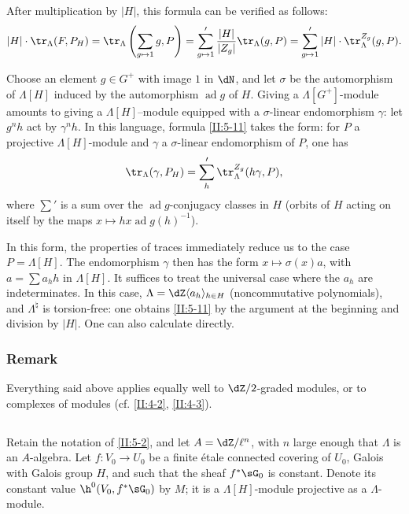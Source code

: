 \documentclass[oneside]{book}
\begin{document}
After multiplication by $|H|$, this formula can be verified as follows:
\[
  |H|\cdot \tr_\Lambda(F,P_H)
    = \tr_\Lambda\left(\sum_{g\mapsto 1} g,P\right)
    = \sum_{g\mapsto 1}' \frac{|H|}{|Z_g|}\tr_\Lambda(g,P)
    = \sum_{g\mapsto 1}' |H|\cdot \tr_\Lambda^{Z_g}(g,P) \text{.}
\]

Choose an element $g\in G^+$ with image $1$ in $\dN$, and let $\sigma$ be
the automorphism of $\Lambda[H]$ induced by the automorphism
$\operatorname{ad} g$ of $H$. Giving a $\Lambda[G^+]$-module amounts to
giving a $\Lambda[H]$--module equipped with a $\sigma$-linear endomorphism
$\gamma$: let $g^n h$ act by $\gamma^n h$. In this language, formula
\ref{II:5-11} takes the form: for $P$ a projective $\Lambda[H]$-module and
$\gamma$ a $\sigma$-linear endomorphism of $P$, one has
\[
  \tr_\Lambda(\gamma,P_H) = \sum_h' \tr_\Lambda^{Z_g}(h\gamma,P)\text{,}
\]
where $\sum'$ is a sum over the $\operatorname{ad}g$-conjugacy classes in
$H$ (orbits of $H$ acting on itself by the maps
$x\mapsto h x \operatorname{ad} g(h)^{-1}$).

In this form, the properties of traces immediately reduce us to the case
$P=\Lambda[H]$. The endomorphism $\gamma$ then has the form
$x\mapsto \sigma(x) a$, with $a=\sum a_h h$ in $\Lambda[H]$. It suffices to
treat the universal case where the $a_h$ are indeterminates. In this case,
$\Lambda=\dZ\langle a_h\rangle_{h\in H}$ (noncommutative polynomials), and
$\Lambda^\natural$ is torsion-free: one obtains \ref{II:5-11} by the
argument at the beginning and division by $|H|$. One can also calculate
directly.






\subsubsection{Remark}\label{II:5-11-1}

Everything said above applies equally well to $\dZ/2$-graded modules, or to
complexes of modules (cf. \ref{II:4-2}, \ref{II:4-3}).






\subsection{}\label{II:5-12}

Retain the notation of \ref{II:5-2}, and let $A=\dZ/\ell^n$, with $n$ large
enough that $\Lambda$ is an $A$-algebra. Let $f:V_0\to U_0$ be a finite
\'etale connected covering of $U_0$, Galois with Galois group $H$, and such
that the sheaf $f^*\sG_0$ is constant. Denote its constant value
$\h^0(V_0,f^*\sG_0)$ by $M$; it is a $\Lambda[H]$-module projective as a
$\Lambda$-module.
\end{document}
